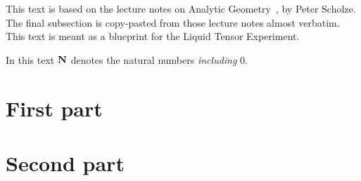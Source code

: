 \maketitle

\begin{remark}
	This text is based on the lecture notes on Analytic Geometry~\cite{Analytic},
	by Peter Scholze.
  The final subsection is copy-pasted from those lecture notes almost verbatim.
  This text is meant as a blueprint for the Liquid Tensor Experiment.
\end{remark}

\begin{remark}
  In this text $\mathbf{N}$ denotes the natural numbers \emph{including} $0$.
\end{remark}



\section{First part}
\label{cha:one}









\section{Second part}
\label{cha:two}






